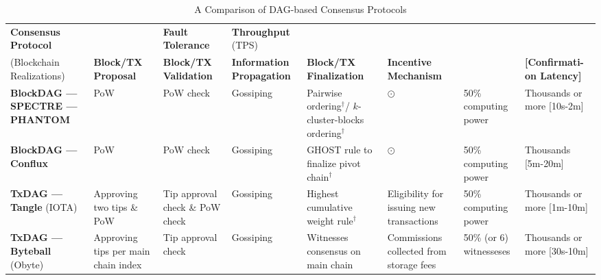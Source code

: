 \begin{table}
    \caption{A Comparison of DAG-based Consensus Protocols}
    \small
    \renewcommand{\arraystretch}{1.1}
    \begin{tabular}{
        |>{\raggedright}p{.9in}|
        |>{\raggedright}p{.67in}
        |>{\raggedright}p{.7in}
        |>{\raggedright}p{.7in}
        |>{\raggedright}p{.75in}
        |>{\raggedright}p{.75in}|
        |>{\raggedright}p{.57in}
        |p{.65in}|
        }
        \hline
        \textbf{Consensus \hspace{.5in} Protocol} & \multicolumn{5}{c||}{\textbf{Five-Component Framework}} & \textbf{Fault \hspace{.5in} Tolerance} & \textbf{Throughput} (TPS)  \\ \cline{2-6}
         (Blockchain Realizations) & \textbf{Block/TX Proposal} & \textbf{Block/TX Validation} & \textbf{Information Propagation} & \textbf{Block/TX \hspace{.5in} Finalization} & \textbf{Incentive Mechanism} & & \textbf{\color{\rcolor}[Confirmati- on Latency]} \\ \hline \hline
         \textcolor{\rcolor}{\textbf{BlockDAG ---SPECTRE ---PHANTOM}} 
         & PoW & PoW check & Gossiping & Pairwise ordering$^\dagger$/ $k$-cluster-blocks ordering$^\dagger$ & $\odot$ & 50\% computing power & Thousands or more \hspace{1in} {\color{\rcolor}[10s-2m]} \\ \hline
         \textcolor{\rcolor}{\textbf{BlockDAG ---Conflux}} 
         & PoW & PoW check & Gossiping & GHOST rule to finalize pivot chain$^\dagger$ & $\odot$ & 50\% computing power & Thousands \hspace{1in} {\color{\rcolor}[5m-20m]} \\ \hline
         \textcolor{\rcolor}{\textbf{TxDAG ---Tangle}} \hspace{1in} (IOTA) 
         & Approving two tips \& PoW & Tip approval check \& PoW check & Gossiping & Highest cumulative weight rule$^\dagger$ & Eligibility for issuing new transactions & 50\% computing power & Thousands or more {\color{\rcolor}[1m-10m]}\\ \hline
         \textcolor{\rcolor}{\textbf{TxDAG ---Byteball}} (Obyte) 
         & Approving tips per main chain index & Tip approval check & Gossiping & Witnesses consensus on main chain & Commissions collected from storage fees & 50\% (or 6) witnesseses & Thousands or more {\color{\rcolor}[30s-10m]}\\ \hline

\end{tabular}
\end{table}
